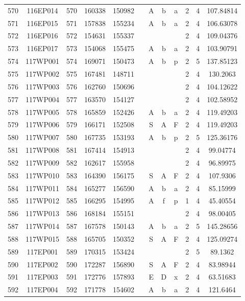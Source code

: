 \begin{tabular}{|*{12}{c|}}
570 & 116EP014 & 570 & 160338 & 150982 &  & A & b & a & 2 & 4 & 107.84814 \\ 
571 & 116EP015 & 571 & 157838 & 155234 &  & A & b & a & 2 & 4 & 106.63078 \\ 
572 & 116EP016 & 572 & 154631 & 155337 &  &  &  &  & 2 & 4 & 109.04376 \\ 
573 & 116EP017 & 573 & 154068 & 155475 &  & A & b & a & 2 & 4 & 103.90791 \\ 
574 & 117WP001 & 574 & 169071 & 150473 &  & A & b & p & 2 & 5 & 137.85123 \\ 
575 & 117WP002 & 575 & 167481 & 148711 &  &  &  &  & 2 & 4 & 130.2063 \\ 
576 & 117WP003 & 576 & 162760 & 150696 &  &  &  &  & 2 & 4 & 104.12622 \\ 
577 & 117WP004 & 577 & 163570 & 154127 &  &  &  &  & 2 & 4 & 102.58952 \\ 
578 & 117WP005 & 578 & 165859 & 152426 &  & A & b & a & 2 & 4 & 119.49203 \\ 
579 & 117WP006 & 579 & 166171 & 152508 &  & S & A & F & 2 & 4 & 119.49203 \\ 
580 & 117WP007 & 580 & 167735 & 153193 &  & A & b & p & 2 & 5 & 125.36176 \\ 
581 & 117WP008 & 581 & 167414 & 154913 &  &  &  &  & 2 & 4 & 99.04774 \\ 
582 & 117WP009 & 582 & 162617 & 155958 &  &  &  &  & 2 & 4 & 96.89975 \\ 
583 & 117WP010 & 583 & 164390 & 156175 &  & S & A & F & 2 & 4 & 107.9306 \\ 
584 & 117WP011 & 584 & 165277 & 156590 &  & A & b & a & 2 & 4 & 85.15999 \\ 
585 & 117WP012 & 585 & 166295 & 154995 &  & A & f & p & 1 & 4 & 45.40554 \\ 
586 & 117WP013 & 586 & 168184 & 155151 &  &  &  &  & 2 & 4 & 98.00405 \\ 
587 & 117WP014 & 587 & 167578 & 150143 &  & A & b & a & 2 & 5 & 145.28656 \\ 
588 & 117WP015 & 588 & 165705 & 150352 &  & S & A & F & 2 & 4 & 125.09274 \\ 
589 & 117EP001 & 589 & 170315 & 153424 &  &  &  &  & 2 & 5 & 89.1362 \\ 
590 & 117EP002 & 590 & 172287 & 156890 &  & S & A & F & 2 & 4 & 83.98944 \\ 
591 & 117EP003 & 591 & 172776 & 157893 &  & E & D & x & 2 & 4 & 63.51683 \\ 
592 & 117EP004 & 592 & 171778 & 154602 &  & A & b & a & 2 & 4 & 121.6464 \\ 

\end{tabular}
